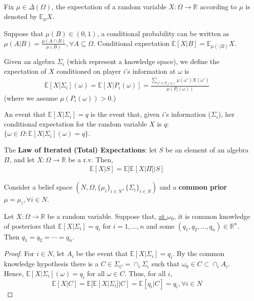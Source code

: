 \documentclass[11pt]{elegantbook}
\begin{document}
Fix $\mu\in\Delta(\Omega)$, the expectation of a random variable $X:\Omega \rightarrow \mathbb{R}$ according to $\mu$ is denoted by $\mathbb{E}_\mu X$.

Suppose that $\mu(B)\in(0,1)$, a conditional probability can be written as $\mu(A|B)=\frac{\mu(A\cap B)}{\mu(B)},\forall A\subseteq \Omega$. Conditional expectation $\mathbb{E}[X|B]=\mathbb{E}_{\mu(\cdot|B)}X$.

Given an algebra $\Sigma_i$ (which represent a knowledge space), we define the expectation of $X$ conditioned on player $i$'s information at $\omega$ is
\begin{equation}
    \begin{aligned}
        \mathbb{E}[X|\Sigma_i](\omega)=\mathbb{E}[X|P_i(\omega)]=\frac{\sum_{\omega'\in P_i(\omega)}\mu(\omega')X(\omega')}{\mu(P_i(\omega))}
    \end{aligned}
    \nonumber
\end{equation}
(where we assume $\mu(P_i(\omega))>0$.)

An event that $\mathbb{E}[X|\Sigma_i]=q$ is the event that, given $i$'s information ($\Sigma_i$), her conditional expectation for the random variable $X$ is $q$: $\{\omega\in\Omega:\mathbb{E}[X|\Sigma_i](\omega)=q\}$.

\begin{proposition}
    The \textbf{Law of Iterated (Total) Expectations}: let $S$ be an element of an algebra $\Pi$, and let $X:\Omega \rightarrow \mathbb{R}$ be a r.v. Then,
    \begin{equation}
        \begin{aligned}
            \mathbb{E}[X|S]=\mathbb{E}[\mathbb{E}[X|\Pi]|S]
        \end{aligned}
        \nonumber
    \end{equation}
\end{proposition}

Consider a belief space $\left(N,\Omega,\{\mu_i\}_{i\in N},\{\Sigma_i\}_{i\in N}\right)$ and a \textbf{common prior} $\mu=\mu_i,\forall i\in N$.

\begin{theorem}
    Let $X:\Omega \rightarrow \mathbb{R}$ be a random variable. Suppose that, \underline{at $\omega_0$}, it is common knowledge of posteriors that $\mathbb{E}[X|\Sigma_i]=q_i$ for $i=1,...,n$ and some $(q_1,q_2,...,q_n)\in \mathbb{R}^n$. Then $q_1=q_2=\cdots =q_n$.
\end{theorem}
\begin{proof}
    For $i\in N$, let $A_i$ be the event that $\mathbb{E}[X|\Sigma_i]=q_i$. By the common knowledge hypothesis there is a $C\in \Sigma_C=\cap_i\Sigma_i$ such that $\omega_0\in C\subset \cap_i A_i$. Hence, $\mathbb{E}[X|\Sigma_i](\omega)=q_i$ for all $\omega\in C$. Thus, for all $i$, $$\mathbb{E}[X|C]=\mathbb{E}[\mathbb{E}[X|\Sigma_i]|C]=\mathbb{E}[q_i|C]=q_i,\forall i\in N$$
\end{proof}
\end{document}
